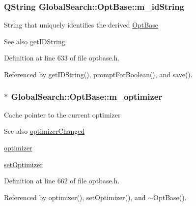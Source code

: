 \subsubsection[{m\+\_\+id\+String}]{\setlength{\rightskip}{0pt plus 5cm}Q\+String Global\+Search\+::\+Opt\+Base\+::m\+\_\+id\+String\hspace{0.3cm}{\ttfamily [protected]}}\label{classGlobalSearch_1_1OptBase_af9223062bbb616246d5bf60ad29e1c7d}
String that uniquely identifies the derived \hyperlink{classGlobalSearch_1_1OptBase}{Opt\+Base} \begin{DoxySeeAlso}{See also}
\hyperlink{classGlobalSearch_1_1OptBase_ae4223191dd58c47e186bbdf07f99ef1c}{get\+I\+D\+String} 
\end{DoxySeeAlso}


Definition at line 633 of file optbase.\+h.



Referenced by get\+I\+D\+String(), prompt\+For\+Boolean(), and save().

\hypertarget{classGlobalSearch_1_1OptBase_a9bc76450b0d52ab9fc9a4caaf97143b7}{}
\subsubsection[{m\+\_\+optimizer}]{$\ast$ Global\+Search\+::\+Opt\+Base\+::m\+\_\+optimizer\hspace{0.3cm}{\ttfamily [protected]}}\label{classGlobalSearch_1_1OptBase_a9bc76450b0d52ab9fc9a4caaf97143b7}
Cache pointer to the current optimizer \begin{DoxySeeAlso}{See also}
\hyperlink{classGlobalSearch_1_1OptBase_a8f07729ab8372e2a41de0d38d7947c6a}{optimizer\+Changed} 

\hyperlink{classGlobalSearch_1_1OptBase_a4dce62d15f24d665c807047aa5c618fc}{optimizer} 

\hyperlink{classGlobalSearch_1_1OptBase_addd46a192c8a68553a12b30d18246f1e}{set\+Optimizer} 
\end{DoxySeeAlso}


Definition at line 662 of file optbase.\+h.



Referenced by optimizer(), set\+Optimizer(), and $\sim$\+Opt\+Base().

\hypertarget{classGlobalSearch_1_1OptBase_a187a29ceafe0c4a45ecb7a925267f93a}{}
